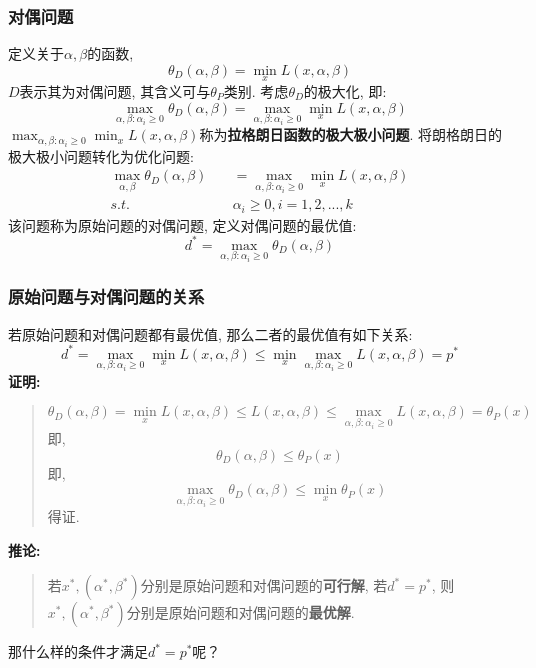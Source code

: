 \subsubsection{对偶问题}
定义关于$\alpha, \beta$的函数, 
$$
\theta_D(\alpha, \beta) = \mathop{min}_{x} L(x, \alpha, \beta)
$$
$D$表示其为对偶问题, 其含义可与$\theta_P$类别. 考虑$\theta_D$的极大化, 即: 
$$
\mathop{max}_{\alpha, \beta: \alpha_i \geqslant 0} \theta_D(\alpha, \beta) = \mathop{max}_{\alpha, \beta: \alpha_i \geqslant 0} \mathop{min}_{x} L(x, \alpha, \beta)
$$
$\mathop{max}_{\alpha, \beta: \alpha_i \geqslant 0} \mathop{min}_{x} L(x, \alpha, \beta)$称为\textbf{拉格朗日函数的极大极小问题}. 将朗格朗日的极大极小问题转化为优化问题: 
\begin{align}
	\mathop{max}_{\alpha, \beta} \theta_D(\alpha, \beta)&\quad = \mathop{max}_{\alpha, \beta: \alpha_i \geqslant 0} \mathop{min}_{x} L(x, \alpha, \beta) \nonumber \\
	s.t.&\quad \alpha_i \geqslant 0, i = 1, 2, ..., k \nonumber
\end{align}
该问题称为原始问题的对偶问题, 定义对偶问题的最优值: 
$$
d^* = \mathop{max}_{\alpha, \beta: \alpha_i \geqslant 0} \theta_D(\alpha, \beta)
$$

\subsubsection{原始问题与对偶问题的关系}
若原始问题和对偶问题都有最优值, 那么二者的最优值有如下关系: 
$$
d^* = \mathop{max}_{\alpha, \beta: \alpha_i \geqslant 0} \mathop{min}_{x} L(x, \alpha, \beta) \leqslant \mathop{min}_{x} \mathop{max}_{\alpha, \beta: \alpha_i \geqslant 0} L(x, \alpha, \beta) = p^*
$$
\textbf{证明: }
\begin{quotation}
	$$
	\theta_D(\alpha, \beta) = \mathop{min}_{x} L(x, \alpha, \beta) \leqslant L(x, \alpha, \beta) \leqslant \mathop{max}_{\alpha, \beta: \alpha_i \geqslant 0} L(x, \alpha, \beta) = \theta_P(x)
	$$
	即, 
	$$
	\theta_D (\alpha, \beta) \leqslant \theta_P (x)
	$$
	即, 
	$$
	\mathop{max}_{\alpha, \beta:\alpha_i \geqslant 0} \theta_D (\alpha, \beta) \leqslant \mathop{min}_{x} \theta_P (x)
	$$
	得证. 
\end{quotation}
\textbf{推论: }
\begin{quotation}
	若$x^*, (\alpha^*, \beta^*)$分别是原始问题和对偶问题的\textbf{可行解}, 若$d^* = p^*$, 则$x^*, (\alpha^*, \beta^*)$分别是原始问题和对偶问题的\textbf{最优解}. 
\end{quotation} 
那什么样的条件才满足$d^* = p^*$呢？

